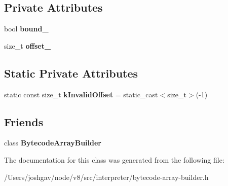 \subsection*{Private Attributes}
\begin{DoxyCompactItemize}
\item 
bool {\bfseries bound\+\_\+}\hypertarget{classv8_1_1internal_1_1interpreter_1_1_bytecode_label_ade155a18acda29aa74d973783114af05}{}\label{classv8_1_1internal_1_1interpreter_1_1_bytecode_label_ade155a18acda29aa74d973783114af05}

\item 
size\+\_\+t {\bfseries offset\+\_\+}\hypertarget{classv8_1_1internal_1_1interpreter_1_1_bytecode_label_a2ec7aa7181b4378f84def0c1366ec758}{}\label{classv8_1_1internal_1_1interpreter_1_1_bytecode_label_a2ec7aa7181b4378f84def0c1366ec758}

\end{DoxyCompactItemize}
\subsection*{Static Private Attributes}
\begin{DoxyCompactItemize}
\item 
static const size\+\_\+t {\bfseries k\+Invalid\+Offset} = static\+\_\+cast$<$size\+\_\+t$>$(-\/1)\hypertarget{classv8_1_1internal_1_1interpreter_1_1_bytecode_label_a73dc66cd5bf53cd490de8f8b81781040}{}\label{classv8_1_1internal_1_1interpreter_1_1_bytecode_label_a73dc66cd5bf53cd490de8f8b81781040}

\end{DoxyCompactItemize}
\subsection*{Friends}
\begin{DoxyCompactItemize}
\item 
class {\bfseries Bytecode\+Array\+Builder}\hypertarget{classv8_1_1internal_1_1interpreter_1_1_bytecode_label_ad2b2e85e9d5e877fc73da312cd63a6b1}{}\label{classv8_1_1internal_1_1interpreter_1_1_bytecode_label_ad2b2e85e9d5e877fc73da312cd63a6b1}

\end{DoxyCompactItemize}


The documentation for this class was generated from the following file\+:\begin{DoxyCompactItemize}
\item 
/\+Users/joshgav/node/v8/src/interpreter/bytecode-\/array-\/builder.\+h\end{DoxyCompactItemize}
